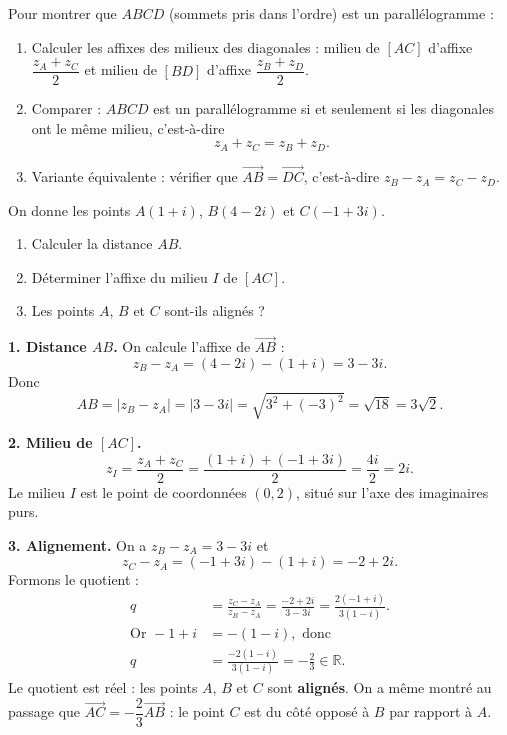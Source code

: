 \documentclass[11pt]{article}
\begin{document}
\begin{methode}
Pour montrer que $ABCD$ (sommets pris dans l'ordre) est un parallélogramme :
\begin{enumerate}
\item Calculer les affixes des milieux des diagonales : milieu de $[AC]$ d'affixe $\dfrac{z_A + z_C}{2}$ et milieu de $[BD]$ d'affixe $\dfrac{z_B + z_D}{2}$.
\item Comparer : $ABCD$ est un parallélogramme si et seulement si les diagonales ont le même milieu, c'est-à-dire
\[ z_A + z_C = z_B + z_D. \]
\item Variante équivalente : vérifier que $\overrightarrow{AB} = \overrightarrow{DC}$, c'est-à-dire $z_B - z_A = z_C - z_D$.
\end{enumerate}
\end{methode}

\begin{exoresolu}
On donne les points $A(1 + i)$, $B(4 - 2i)$ et $C(-1 + 3i)$.
\begin{enumerate}
\item Calculer la distance $AB$.
\item Déterminer l'affixe du milieu $I$ de $[AC]$.
\item Les points $A$, $B$ et $C$ sont-ils alignés ?
\end{enumerate}
\tcblower
\textbf{1. Distance $AB$.} On calcule l'affixe de $\overrightarrow{AB}$ :
\[ z_B - z_A = (4 - 2i) - (1 + i) = 3 - 3i. \]
Donc
\[ AB = |z_B - z_A| = |3 - 3i| = \sqrt{3^2 + (-3)^2} = \sqrt{18} = 3\sqrt{2}. \]

\textbf{2. Milieu de $[AC]$.}
\[ z_I = \frac{z_A + z_C}{2} = \frac{(1 + i) + (-1 + 3i)}{2} = \frac{4i}{2} = 2i. \]
Le milieu $I$ est le point de coordonnées $(0, 2)$, situé sur l'axe des imaginaires purs.

\textbf{3. Alignement.} On a $z_B - z_A = 3 - 3i$ et
\[ z_C - z_A = (-1 + 3i) - (1 + i) = -2 + 2i. \]
Formons le quotient :
\begin{align*}
q &= \frac{z_C - z_A}{z_B - z_A} = \frac{-2 + 2i}{3 - 3i} = \frac{2(-1 + i)}{3(1 - i)}. \\
\text{Or } -1 + i &= -(1 - i), \text{ donc} \\
q &= \frac{-2(1 - i)}{3(1 - i)} = -\frac{2}{3} \in \mathbb{R}.
\end{align*}
Le quotient est réel : les points $A$, $B$ et $C$ sont \textbf{alignés}. On a même montré au passage que $\overrightarrow{AC} = -\dfrac{2}{3}\overrightarrow{AB}$ : le point $C$ est du côté opposé à $B$ par rapport à $A$.
\end{exoresolu}
\end{document}
